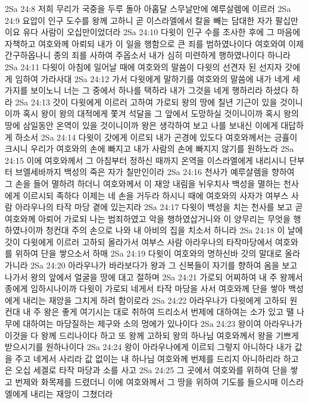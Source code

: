 2Sa 24:8  저희 무리가 국중을 두루 돌아 아홉달 스무날만에 예루살렘에 이르러
2Sa 24:9  요압이 인구 도수를 왕께 고하니 곧 이스라엘에서 칼을 빼는 담대한 자가 팔십만이요 유다 사람이 오십만이었더라
2Sa 24:10  다윗이 인구 수를 조사한 후에 그 마음에 자책하고 여호와께 아뢰되 내가 이 일을 행함으로 큰 죄를 범하였나이다 여호와여 이제 간구하옵나니 종의 죄를 사하여 주옵소서 내가 심히 미련하게 행하였나이다 하니라
2Sa 24:11  다윗이 아침에 일어날 때에 여호와의 말씀이 다윗의 선견자 된 선지자 갓에게 임하여 가라사대
2Sa 24:12  가서 다윗에게 말하기를 여호와의 말씀에 내가 네게 세가지를 보이노니 너는 그 중에서 하나를 택하라 내가 그것을 네게 행하리라 하셨다 하라
2Sa 24:13  갓이 다윗에게 이르러 고하여 가로되 왕의 땅에 칠년 기근이 있을 것이니이까 혹시 왕이 왕의 대적에게 쫓겨 석달을 그 앞에서 도망하실 것이니이까 혹시 왕의 땅에 삼일동안 온역이 있을 것이니이까 왕은 생각하여 보고 나를 보내신 이에게 대답하게 하소서
2Sa 24:14  다윗이 갓에게 이르되 내가 곤경에 있도다 여호와께서는 긍휼이 크시니 우리가 여호와의 손에 빠지고 내가 사람의 손에 빠지지 않기를 원하노라
2Sa 24:15  이에 여호와께서 그 아침부터 정하신 때까지 온역을 이스라엘에게 내리시니 단부터 브엘세바까지 백성의 죽은 자가 칠만인이라
2Sa 24:16  천사가 예루살렘을 향하여 그 손을 들어 멸하려 하더니 여호와께서 이 재앙 내림을 뉘우치사 백성을 멸하는 천사에게 이르시되 족하다 이제는 네 손을 거두라 하시니 때에 여호와의 사자가 여부스 사람 아라우나의 타작 마당 곁에 있는지라
2Sa 24:17  다윗이 백성을 치는 천사를 보고 곧 여호와께 아뢰어 가로되 나는 범죄하였고 악을 행하였삽거니와 이 양무리는 무엇을 행하였나이까 청컨대 주의 손으로 나와 내 아비의 집을 치소서 하니라
2Sa 24:18  이 날에 갓이 다윗에게 이르러 고하되 올라가서 여부스 사람 아라우나의 타작마당에서 여호와를 위하여 단을 쌓으소서 하매
2Sa 24:19  다윗이 여호와의 명하신바 갓의 말대로 올라가니라
2Sa 24:20  아라우나가 바라보다가 왕과 그 신복들이 자기를 향하여 옴을 보고 나가서 왕의 앞에서 얼굴을 땅에 대고 절하며
2Sa 24:21  가로되 어찌하여 내 주 왕께서 종에게 임하시나이까 다윗이 가로되 네게서 타작 마당을 사서 여호와께 단을 쌓아 백성에게 내리는 재앙을 그치게 하려 함이로라
2Sa 24:22  아라우나가 다윗에게 고하되 원컨대 내 주 왕은 좋게 여기시는 대로 취하여 드리소서 번제에 대하여는 소가 있고 땔 나무에 대하여는 마당질하는 제구와 소의 멍에가 있나이다
2Sa 24:23  왕이여 아라우나가 이것을 다 왕께 드리나이다 하고 또 왕께 고하되 왕의 하나님 여호와께서 왕을 기쁘게 받으시기를 원하나이다
2Sa 24:24  왕이 아라우나에게 이르되 그렇지 아니하다 내가 값을 주고 네게서 사리라 값 없이는 내 하나님 여호와께 번제를 드리지 아니하리라 하고 은 오십 세겔로 타작 마당과 소를 사고
2Sa 24:25  그 곳에서 여호와를 위하여 단을 쌓고 번제와 화목제를 드렸더니 이에 여호와께서 그 땅을 위하여 기도를 들으시매 이스라엘에게 내리는 재앙이 그쳤더라


